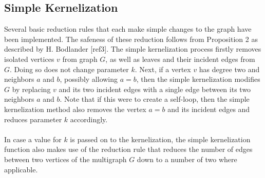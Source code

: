\subsection{Simple Kernelization} %
Several basic reduction rules that each make simple changes to the graph have been implemented. The safeness of these reduction follows from Proposition 2 as described by H. Bodlander [ref3]. The simple kernelization process firstly removes isolated vertices $v$ from graph $G$, as well as leaves and their incident edges from $G$. Doing so does not change parameter $k$. Next, if a vertex $v$ has degree two and neighbors $a$ and $b$, possibly allowing $a=b$, then the simple kernelization modifies $G$ by replacing $v$ and its two incident edges with a single edge between its two neighbors $a$ and $b$. Note that if this were to create a self-loop, then the simple kernelization method also removes the vertex $a=b$ and its incident edges and reduces parameter $k$ accordingly. \\\\
In case a value for $k$ is passed on to the kernelization, the simple kernelization function also makes use of the reduction rule that reduces the number of edges between two vertices of the multigraph $G$ down to a number of two where applicable.	
